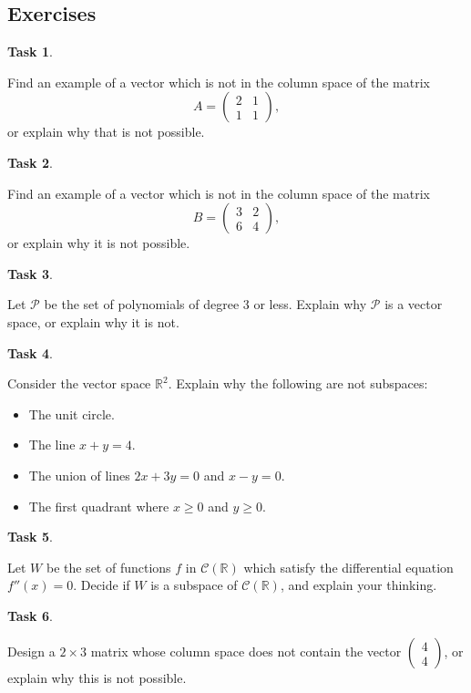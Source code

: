 \documentclass[10pt,]{book}
\theoremstyle{plain}
\theoremstyle{definition}
\numberwithin{equation}{section}
\newtheorem{task}{Task}[chapter]
\begin{document}
\subsection[Exercises]{Exercises}\label{subsection-62}
\begin{task}
\label{task-82}

        Find an example of a vector which is not in the column space of the
        matrix \[
        A = \begin{pmatrix} 2 & 1  \\ 1 & 1 \end{pmatrix},
        \] or explain why that is not possible.
      \end{task}
\begin{task}
\label{task-83}

        Find an example of a vector which is not in the column space of the
        matrix \[
        B = \begin{pmatrix} 3 & 2 \\ 6 & 4 \end{pmatrix},
        \] or explain why it is not possible.
      \end{task}
\begin{task}
\label{task-84}

        Let \(\mathcal{P}\) be the set of polynomials of degree 3 or less.
        Explain why \(\mathcal{P}\) is a vector space, or explain why it is not.
      \end{task}
\begin{task}
\label{task-85}

        Consider the vector space \(\mathbb{R}^2\). Explain why the following
        are not subspaces:
        \begin{itemize}
\item{}The unit circle.\item{}The line \(x+y = 4\).\item{}The union of lines \(2x+3y = 0\) and \(x-y=0\).\item{}The first quadrant where \(x\geq 0\) and \(y\geq 0\).\end{itemize}
\end{task}
\begin{task}
\label{task-86}

        Let \(W\) be the set of functions \(f\) in
        \(\mathcal{C}(\mathbb{R})\) which satisfy the differential equation
        \(f''(x) = 0\). Decide if \(W\) is a subspace of
        \(\mathcal{C}(\mathbb{R})\), and explain your thinking.
      \end{task}
\begin{task}
\label{task-87}

        Design a \(2\times 3\) matrix whose column space does not contain the
        vector \(\begin{pmatrix} 4 \\ 4 \end{pmatrix}\), or explain why this is
        not possible.
      \end{task}
\clearpage
\typeout{************************************************}
\typeout{************************************************}
\end{document}
